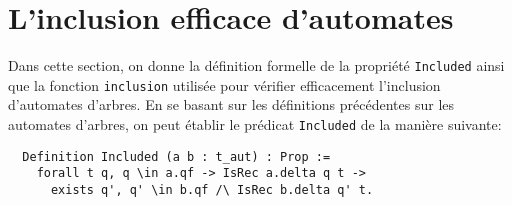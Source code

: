 




\section{L'inclusion efficace d'automates}
\label{sec:inclusion}

Dans cette section, on donne la définition formelle de la propriété \lstinline!Included! ainsi
que la fonction \lstinline!inclusion!  utilisée pour vérifier efficacement l'inclusion d'automates d'arbres.
En se basant sur les définitions précédentes sur les automates d'arbres, on peut établir
le prédicat \lstinline!Included! de la manière suivante:

\begin{lstlisting}
  Definition Included (a b : t_aut) : Prop :=
    forall t q, q \in a.qf -> IsRec a.delta q t ->
      exists q', q' \in b.qf /\ IsRec b.delta q' t.
\end{lstlisting}


